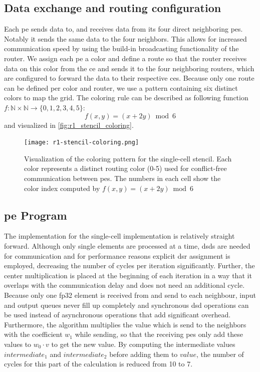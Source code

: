 \subsection{Data exchange and routing configuration}
Each \ac{pe} sends data to, and receives data from its four direct neighboring \acp{pe}. Notably it sends the same data to the four neighbors. This allows for increased communication speed by using the build-in broadcasting functionality of the router. We assign each \ac{pe} a color and define a route so that the router receives data on this color from the \ac{ce} and sends it to the four neighboring routers, which are configured to forward the data to their respective \acp{ce}. Because only one route can be defined per color and router, we use a pattern containing six distinct colors to map the grid.
The coloring rule can be described as following function $f:\mathbb{N}\times\mathbb{N}\to\{0,1,2,3,4,5\}$:
\begin{equation}
    \label{eq:coloring_function}
    f(x,y) = (x + 2y) \bmod 6
\end{equation}
and visualized in \autoref{fig:r1_stencil_coloring}.
\begin{figure}
    \centering
    \texttt{[image: r1-stencil-coloring.png]}
    \caption{Visualization of the coloring pattern for the single-cell stencil. Each color represents a distinct routing color (0-5) used for conflict-free communication between \acp{pe}. The numbers in each cell show the color index computed by $f(x,y) = (x + 2y) \bmod 6$}
    \label{fig:r1_stencil_coloring}
\end{figure}

\subsection{\ac{pe} Program}
The implementation for the single-cell implementation is relatively straight forward.
Although only single elements are processed at a time, \acp{dsd} are needed for communication and for performance reasons explicit \ac{dsr} assignment is employed, decreasing the number of cycles per iteration significantly.  
Further, the center multiplication is placed at the beginning of each iteration in a way that it overlaps with the communication delay and does not need an additional cycle.
Because only one fp32 element is received from and send to each neighbour, input and output queues never fill up completely and synchronous \ac{dsd} operations can be used instead of asynchronous operations that add significant overhead.
Furthermore, the algorithm multiplies the value which is send to the neighbors with the coefficient $w_1$ while sending, so that the receiving \acp{pe} only add these values to $w_0 \cdot v$ to get the new value.
By computing the intermediate values $intermediate_1$ and $intermediate_2$ before adding them to $value$, the number of cycles for this part of the calculation is reduced from 10 to 7.

